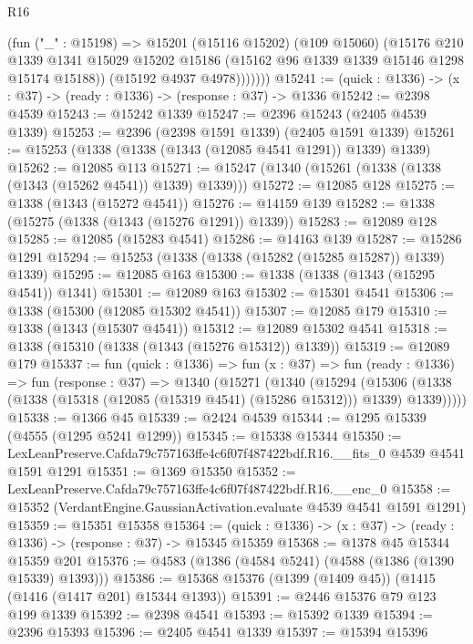 \begin{lexlean}{R16}
\begin{coremodule}
              (fun ("_" : @15198) =>
              @15201
                (@15116 @15202)
                (@109 @15060)
                (@15176
                  @210
                  @1339
                  @1341
                  @15029
                  @15202
                  @15186
                  (@15162 @96 @1339 @1339 @15146 @1298 @15174 @15188))
                (@15192 @4937 @4978)))))))
@15241 := (quick : @1336) -> (x : @37) -> (ready : @1336) -> (response : @37) -> @1336
@15242 := @2398 @4539
@15243 := @15242 @1339
@15247 := @2396 @15243 (@2405 @4539 @1339)
@15253 := @2396 (@2398 @1591 @1339) (@2405 @1591 @1339)
@15261 := @15253 (@1338 (@1338 (@1343 (@12085 @4541 @1291)) @1339) @1339)
@15262 := @12085 @113
@15271 := @15247 (@1340 (@15261 (@1338 (@1338 (@1343 (@15262 @4541)) @1339) @1339)))
@15272 := @12085 @128
@15275 := @1338 (@1343 (@15272 @4541))
@15276 := @14159 @139
@15282 := @1338 (@15275 (@1338 (@1343 (@15276 @1291)) @1339))
@15283 := @12089 @128
@15285 := @12085 (@15283 @4541)
@15286 := @14163 @139
@15287 := @15286 @1291
@15294 := @15253 (@1338 (@1338 (@15282 (@15285 @15287)) @1339) @1339)
@15295 := @12085 @163
@15300 := @1338 (@1338 (@1343 (@15295 @4541)) @1341)
@15301 := @12089 @163
@15302 := @15301 @4541
@15306 := @1338 (@15300 (@12085 @15302 @4541))
@15307 := @12085 @179
@15310 := @1338 (@1343 (@15307 @4541))
@15312 := @12089 @15302 @4541
@15318 := @1338 (@15310 (@1338 (@1343 (@15276 @15312)) @1339))
@15319 := @12089 @179
@15337 := fun (quick : @1336) =>
  fun (x : @37) =>
  fun (ready : @1336) =>
  fun (response : @37) =>
  @1340
    (@15271
      (@1340
        (@15294
          (@15306 (@1338 (@1338 (@15318 (@12085 (@15319 @4541) (@15286 @15312))) @1339) @1339)))))
@15338 := @1366 @45
@15339 := @2424 @4539
@15344 := @1295 @15339 (@4555 (@1295 @5241 @1299))
@15345 := @15338 @15344
@15350 := LexLeanPreserve.Cafda79c757163ffe4c6f07f487422bdf.R16.__fits_0 @4539 @4541 @1591 @1291
@15351 := @1369 @15350
@15352 := LexLeanPreserve.Cafda79c757163ffe4c6f07f487422bdf.R16.__enc_0
@15358 := @15352 (VerdantEngine.GaussianActivation.evaluate @4539 @4541 @1591 @1291)
@15359 := @15351 @15358
@15364 := (quick : @1336) -> (x : @37) -> (ready : @1336) -> (response : @37) -> @15345 @15359
@15368 := @1378 @45 @15344 @15359 @201
@15376 := @4583 (@1386 (@4584 @5241) (@4588 (@1386 (@1390 @15339) @1393)))
@15386 := @15368 @15376 (@1399 (@1409 @45)) (@1415 (@1416 (@1417 @201) @15344 @1393))
@15391 := @2446 @15376 @79 @123 @199 @1339
@15392 := @2398 @4541
@15393 := @15392 @1339
@15394 := @2396 @15393
@15396 := @2405 @4541 @1339
@15397 := @15394 @15396

\end{coremodule}
\end{lexlean}
